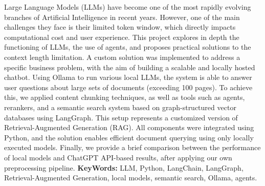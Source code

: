 \vskip 1cm
Large Language Models (LLMs) have become one of the most rapidly evolving branches of Artificial Intelligence in recent years. However, one of the main challenges they face is their limited token window, which directly impacts computational cost and user experience. This project explores in depth the functioning of LLMs, the use of agents, and proposes practical solutions to the context length limitation.
\vskip 1cm
A custom solution was implemented to address a specific business problem, with the aim of building a scalable and locally hosted chatbot. Using Ollama to run various local LLMs, the system is able to answer user questions about large sets of documents (exceeding 100 pages). To achieve this, we applied content chunking techniques, as well as tools such as agents, rerankers, and a semantic search system based on graph-structured vector databases using LangGraph. This setup represents a customized version of Retrieval-Augmented Generation (RAG).
\vskip 1cm
All components were integrated using Python, and the solution enables efficient document querying using only locally executed models. Finally, we provide a brief comparison between the performance of local models and ChatGPT API-based results, after applying our own preprocessing pipeline.
\vskip 1cm
\textbf{KeyWords:} LLM, Python, LangChain, LangGraph, Retrieval-Augmented Generation, local models, semantic search, Ollama, agents.